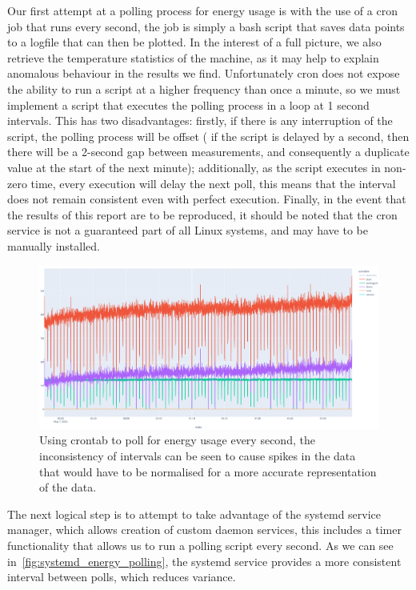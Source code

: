Our first attempt at a polling process for energy usage is with the use of a cron job that runs every second, the job
is simply a bash script that saves data points to a logfile that can then be plotted.
In the interest of a full picture, we also retrieve the temperature statistics of the machine, as it may help to
explain anomalous behaviour in the results we find.
Unfortunately cron does not expose the ability to run a script at a higher frequency than once a minute, so we must
implement a script that executes the polling process in a loop at 1 second intervals.
This has two disadvantages: firstly, if there is any interruption of the script, the polling process will be offset (
if the script is delayed by a second, then there will be a 2-second gap between measurements, and consequently a
duplicate value at the start of the next minute); additionally, as the script executes in non-zero time, every execution
will delay the next poll, this means that the interval does not remain consistent even with perfect execution.
Finally, in the event that the results of this report are to be reproduced, it should be noted that the cron service is
not a guaranteed part of all Linux systems, and may have to be manually installed.

\begin{figure}[H]
    \centering
    \includegraphics[width=15cm]{figures/introduction/crontab_energy_polling}
    \caption{Using crontab to poll for energy usage every second, the inconsistency of intervals can be seen to cause
    spikes in the data that would have to be normalised for a more accurate representation of the data.}
    \label{fig:crontab_energy_polling}
\end{figure}

The next logical step is to attempt to take advantage of the systemd service manager, which allows creation of custom
daemon services, this includes a timer functionality that allows us to run a polling script every second.
As we can see in~\ref{fig:systemd_energy_polling}, the systemd service provides a more consistent interval between
polls, which reduces variance.

